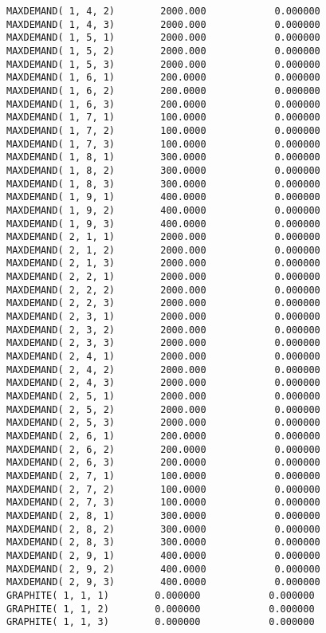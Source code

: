 \documentclass[12pt]{article}
\begin{document}
\begin{appendices}
\begin{lstlisting}
MAXDEMAND( 1, 4, 2)        2000.000            0.000000
MAXDEMAND( 1, 4, 3)        2000.000            0.000000
MAXDEMAND( 1, 5, 1)        2000.000            0.000000
MAXDEMAND( 1, 5, 2)        2000.000            0.000000
MAXDEMAND( 1, 5, 3)        2000.000            0.000000
MAXDEMAND( 1, 6, 1)        200.0000            0.000000
MAXDEMAND( 1, 6, 2)        200.0000            0.000000
MAXDEMAND( 1, 6, 3)        200.0000            0.000000
MAXDEMAND( 1, 7, 1)        100.0000            0.000000
MAXDEMAND( 1, 7, 2)        100.0000            0.000000
MAXDEMAND( 1, 7, 3)        100.0000            0.000000
MAXDEMAND( 1, 8, 1)        300.0000            0.000000
MAXDEMAND( 1, 8, 2)        300.0000            0.000000
MAXDEMAND( 1, 8, 3)        300.0000            0.000000
MAXDEMAND( 1, 9, 1)        400.0000            0.000000
MAXDEMAND( 1, 9, 2)        400.0000            0.000000
MAXDEMAND( 1, 9, 3)        400.0000            0.000000
MAXDEMAND( 2, 1, 1)        2000.000            0.000000
MAXDEMAND( 2, 1, 2)        2000.000            0.000000
MAXDEMAND( 2, 1, 3)        2000.000            0.000000
MAXDEMAND( 2, 2, 1)        2000.000            0.000000
MAXDEMAND( 2, 2, 2)        2000.000            0.000000
MAXDEMAND( 2, 2, 3)        2000.000            0.000000
MAXDEMAND( 2, 3, 1)        2000.000            0.000000
MAXDEMAND( 2, 3, 2)        2000.000            0.000000
MAXDEMAND( 2, 3, 3)        2000.000            0.000000
MAXDEMAND( 2, 4, 1)        2000.000            0.000000
MAXDEMAND( 2, 4, 2)        2000.000            0.000000
MAXDEMAND( 2, 4, 3)        2000.000            0.000000
MAXDEMAND( 2, 5, 1)        2000.000            0.000000
MAXDEMAND( 2, 5, 2)        2000.000            0.000000
MAXDEMAND( 2, 5, 3)        2000.000            0.000000
MAXDEMAND( 2, 6, 1)        200.0000            0.000000
MAXDEMAND( 2, 6, 2)        200.0000            0.000000
MAXDEMAND( 2, 6, 3)        200.0000            0.000000
MAXDEMAND( 2, 7, 1)        100.0000            0.000000
MAXDEMAND( 2, 7, 2)        100.0000            0.000000
MAXDEMAND( 2, 7, 3)        100.0000            0.000000
MAXDEMAND( 2, 8, 1)        300.0000            0.000000
MAXDEMAND( 2, 8, 2)        300.0000            0.000000
MAXDEMAND( 2, 8, 3)        300.0000            0.000000
MAXDEMAND( 2, 9, 1)        400.0000            0.000000
MAXDEMAND( 2, 9, 2)        400.0000            0.000000
MAXDEMAND( 2, 9, 3)        400.0000            0.000000
GRAPHITE( 1, 1, 1)        0.000000            0.000000
GRAPHITE( 1, 1, 2)        0.000000            0.000000
GRAPHITE( 1, 1, 3)        0.000000            0.000000

\end{lstlisting}
\end{appendices}
\end{document}
